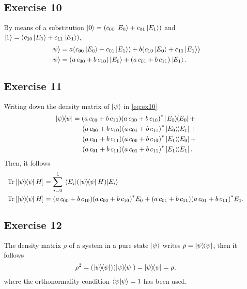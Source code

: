 \subsection{Exercise 10}\noindent
By means of a substitution $\ket{0}=\qty(c_{00}\ket{E_0}+c_{01}\ket{E_1})$
and $\ket{1}=\qty(c_{10}\ket{E_0}+c_{11}\ket{E_1})$,
\begin{subequations}
\begin{align}
\ket{\psi}&=a\qty(c_{00}\ket{E_0}+c_{01}\ket{E_1})+
	b\qty(c_{10}\ket{E_0}+c_{11}\ket{E_1})\\
\ket{\psi}&=\qty(a\,c_{00}+b\,c_{10})\ket{E_0}+
	\qty(a\,c_{01}+b\,c_{11})\ket{E_1}.\label{eq:ex10}
\end{align}
\end{subequations}

\subsection{Exercise 11}\noindent
Writing down the density matrix of $\ket{\psi}$ in \eqref{eq:ex10}
\begin{align}
\dyad{\psi}{\psi}&=\qty(a\,c_{00}+b\,c_{10})\qty(a\,c_{00}+b\,c_{10})^*\dyad{E_0}{E_0}+\nonumber\\
	&\hspace{5mm}\qty(a\,c_{00}+b\,c_{10})\qty(a\,c_{01}+b\,c_{11})^*\dyad{E_0}{E_1}+\nonumber\\ 
		&\hspace{5mm}\qty(a\,c_{01}+b\,c_{11})\qty(a\,c_{00}+b\,c_{10})^*\dyad{E_1}{E_0}+\nonumber\\
			&\hspace{5mm}\qty(a\,c_{01}+b\,c_{11})\qty(a\,c_{01}+b\,c_{11})^*\dyad{E_1}{E_1}.
\end{align}
Then, it follows 
\begin{subequations}
\begin{align}
\Tr\qty[\dyad{\psi}{\psi}H]&=
	\sum_{i=0}^1\matrixel{E_i}{\qty(\dyad{\psi}{\psi}H)}{E_i}\\
\Tr\qty[\dyad{\psi}{\psi}H]&=\qty(a\,c_{00}+b\,c_{10})\qty(a\,c_{00}+b\,c_{10})^*E_0+
		\qty(a\,c_{01}+b\,c_{11})\qty(a\,c_{01}+b\,c_{11})^*E_1.
\end{align}
\end{subequations}

\subsection{Exercise 12}\noindent
The density matrix $\rho$ of a system in a pure state $\ket{\psi}$ writes
$\rho=\dyad{\psi}{\psi}$, then it follows
\begin{align}
\rho^2=\qty(\dyad{\psi}{\psi})\qty(\dyad{\psi}{\psi})=\dyad{\psi}{\psi}=\rho,
\end{align}
where the orthonormality condition $\braket{\psi}{\psi}=1$ has been used.



